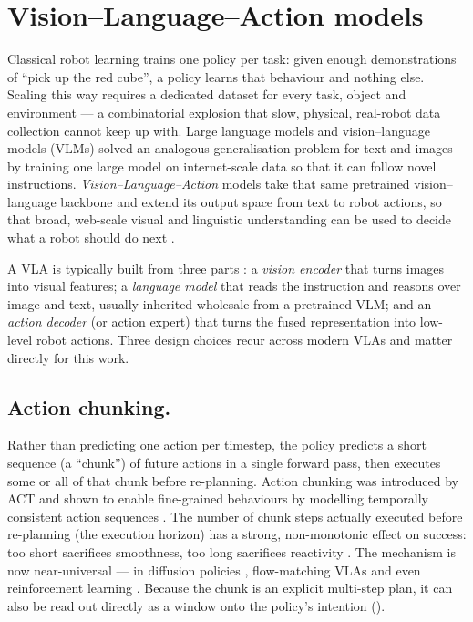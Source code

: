\section{Vision--Language--Action models}
\label{sec:bg-vla}
Classical robot learning trains one policy per task: given enough demonstrations
of ``pick up the red cube'', a policy learns that behaviour and nothing else.
Scaling this way requires a dedicated dataset for every task, object and
environment --- a combinatorial explosion that slow, physical, real-robot data
collection cannot keep up with. Large language models and vision--language models
(VLMs) solved an analogous generalisation problem for text and images by training
one large model on internet-scale data so that it can follow novel instructions.
\emph{Vision--Language--Action} models take that same pretrained vision--language
backbone and extend its output space from text to robot actions, so that broad,
web-scale visual and linguistic understanding can be used to decide what a robot
should do next \parencite{zitkovich2023rt2, sapkota2026vla}.

A VLA is typically built from three parts \parencite{sapkota2026vla}: a
\emph{vision encoder} that turns images into visual features; a \emph{language
model} that reads the instruction and reasons over image and text, usually
inherited wholesale from a pretrained VLM; and an \emph{action decoder} (or action
expert) that turns the fused representation into low-level robot actions. Three
design choices recur across modern VLAs and matter directly for this work.

\subsection{Action chunking.} Rather than predicting one action per timestep, the
policy predicts a short sequence (a ``chunk'') of future actions in a single
forward pass, then executes some or all of that chunk before re-planning. Action
chunking was introduced by ACT and shown to enable fine-grained behaviours by
modelling temporally consistent action sequences
\parencite{zhao2023act, wang2026vlalimits}. The number of chunk steps actually
executed before re-planning (the execution horizon) has a strong, non-monotonic
effect on success: too short sacrifices smoothness, too long sacrifices
reactivity \parencite{wang2026vlalimits}. The mechanism is now near-universal ---
in diffusion policies \parencite{chi2023diffusionpolicy}, flow-matching VLAs
\parencite{black2024pi0, shukor2025smolvla} and even reinforcement learning
\parencite{li2025qchunking}. Because the chunk is an explicit multi-step plan, it can
also be read out directly as a window onto the policy's intention
().

